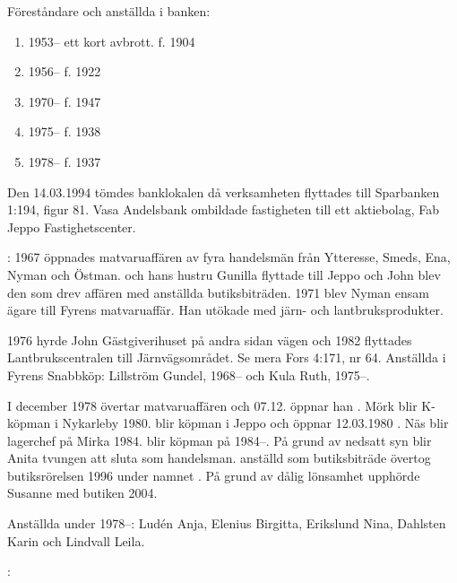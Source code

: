 Föreståndare och anställda i banken:
\begin{enumerate}
  \item {}     1953-- ett kort avbrott.  f. 1904
  \item {}      1956--		                 f. 1922
  \item {}   1970--		                 f. 1947
  \item {}    1975--		                 f. 1938
  \item {}    1978--		                 f. 1937
\end{enumerate}
Den 14.03.1994 tömdes banklokalen då verksamheten flyttades till Sparbanken 1:194, figur 81. Vasa Andelsbank ombildade fastigheten till ett aktiebolag, Fab Jeppo	Fastighetscenter.


:
1967 öppnades matvaruaffären  av fyra handelsmän från Ytteresse, Smeds, Ena, Nyman och Östman.  och hans hustru Gunilla flyttade till Jeppo och John blev den som drev affären med anställda butiksbiträden. 1971 blev Nyman ensam ägare till Fyrens matvaruaffär. Han utökade med järn- och lantbruksprodukter.

1976 hyrde John Gästgiverihuset på andra sidan vägen och 1982 flyttades Lantbrukscentralen till Järnvägsområdet. Se mera Fors 4:171, nr 64.	Anställda i Fyrens Snabbköp:	Lillström Gundel,	1968--	och	Kula Ruth, 1975--.

I december 1978 övertar  matvaruaffären och 07.12. öppnar han . Mörk blir K-köpman i Nykarleby 1980.  blir köpman i Jeppo och öppnar 12.03.1980 . Näs blir lagerchef på Mirka 1984.  blir köpman på 	 1984--. På grund av nedsatt syn blir Anita tvungen att sluta	som handelsman.  anställd som butiksbiträde övertog	butiksrörelsen 1996 under namnet . På grund av dålig lönsamhet upphörde Susanne med butiken 2004.

Anställda under 1978--: Ludén Anja, Elenius Birgitta, Erikslund Nina, Dahlsten Karin och Lindvall Leila.


:

